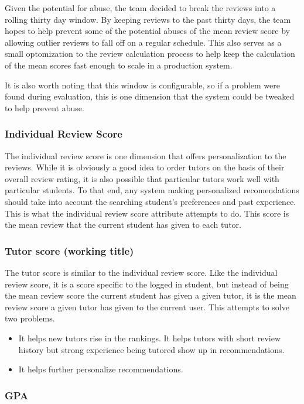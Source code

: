   Given the potential for abuse, the team decided to break the reviews into a
  rolling thirty day window.  By keeping reviews to the past thirty days, the
  team hopes to help prevent some of the potential abuses of the mean review
  score by allowing outlier reviews to fall off on a regular schedule.  This
  also serves as a small optomization to the review calculation process to help
  keep the calculation of the mean scores fast enough to scale in a production
  system.

  It is also worth noting that this window is configurable, so if a problem were
  found during evaluation, this is one dimension that the system could be
  tweaked to help prevent abuse.

  \subsubsection{Individual Review Score}
  The individual review score is one dimension that offers personalization to
  the reviews.  While it is obviously a good idea to order tutors on the basis
  of their overall review rating, it is also possible that particular tutors
  work well with particular students.  To that end, any system making
  personalized recomendations should take into account the searching student's
  preferences and past experience.  This is what the individual review score
  attribute attempts to do.  This score is the mean review that the current
  student has given to each tutor.  

  \subsubsection{Tutor score (working title)} %
  The tutor score is similar to the individual review score.  Like the
  individual review score, it is a score specific to the logged in student, but
  instead of being the mean review score the current student has given a given
  tutor, it is the mean review score a given tutor has given to the current
  user.  This attempts to solve two problems.

  \begin{itemize}
    \item It helps new tutors rise in the rankings.
      It helps tutors with short review history but strong experience being
      tutored show up in recommendations.
    \item It helps further personalize recommendations.
  \end{itemize}
  
\subsubsection{GPA}
